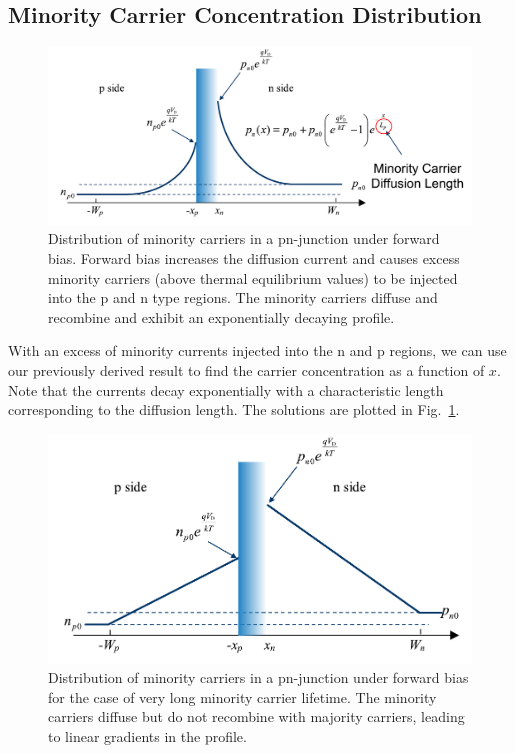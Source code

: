 \subsection{Minority Carrier Concentration Distribution}
\begin{figure}[tb]
\centering
\includegraphics[width=.75\columnwidth]{slide41}
\caption{Distribution of minority carriers in a pn-junction under forward bias.  Forward bias increases the diffusion current and causes excess minority carriers (above thermal equilibrium values) to be injected into the p and n type regions.  The minority carriers diffuse and recombine and exhibit an exponentially decaying profile.}
\label{fig:slide41}
\end{figure}
With an excess of minority currents injected into the n and p regions, we can use our previously derived result to find the carrier concentration as a function of $x$.  Note that the currents decay exponentially with a characteristic length corresponding to the diffusion length.  The solutions are plotted in Fig.~\ref{fig:slide41}.
\begin{figure}[tb]
\centering
\includegraphics[width=.75\columnwidth]{slide42}
\caption{Distribution of minority carriers in a pn-junction under forward bias for the case of very long minority carrier lifetime.  The minority carriers diffuse but do not recombine with majority carriers, leading to linear gradients in the profile.}
\label{fig:slide42}
\end{figure}
